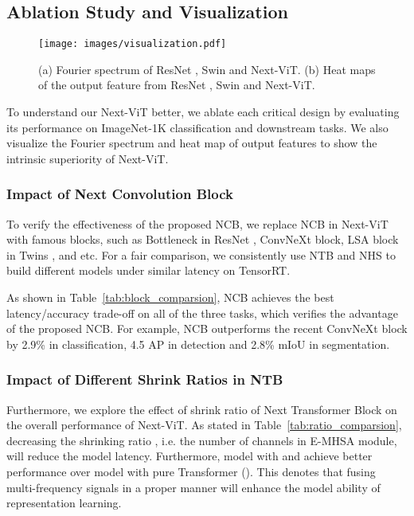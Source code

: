 \documentclass[10pt,twocolumn,letterpaper]{article}
\begin{document}
\subsection{Ablation Study and Visualization}

\begin{figure}[t]
    \centering
    \texttt{[image: images/visualization.pdf]}
    \caption{(a) Fourier spectrum of ResNet \cite{ResNet}, Swin \cite{Swin} and Next-ViT. (b) Heat maps of the output feature from ResNet \cite{ResNet}, Swin \cite{Swin} and Next-ViT.}
    \label{fig:visualization}
\end{figure}

	To understand our Next-ViT better, we ablate each critical design by evaluating its performance on ImageNet-1K classification and downstream tasks. We also visualize the Fourier spectrum and heat map of output features to show the intrinsic superiority of Next-ViT.
	
\subsubsection{Impact of Next Convolution Block}
 To verify the effectiveness of the proposed NCB, we replace NCB in Next-ViT with famous blocks, such as Bottleneck in ResNet \cite{ResNet}, ConvNeXt\cite{ConvNext} block, LSA block in Twins \cite{Twins}, and etc. For a fair comparison, we consistently use NTB and NHS to build different models under similar latency on TensorRT.
 
 As shown in Table~\ref{tab:block_comparsion}, NCB achieves the best latency/accuracy trade-off on all of the three tasks, which verifies the advantage of the proposed NCB. For example, NCB outperforms the recent ConvNeXt block\cite{ResNet} by 2.9\% in classification, 4.5 AP in detection and 2.8\% mIoU in segmentation.

 
\subsubsection{Impact of Different Shrink Ratios in NTB}
Furthermore, we explore the effect of shrink ratio  of Next Transformer Block on the overall performance of Next-ViT.
As stated in Table~\ref{tab:ratio_comparsion}, decreasing the shrinking ratio , i.e. the number of channels in E-MHSA module, will reduce the model latency. Furthermore, model with  and  achieve better performance over model with pure Transformer (). This denotes that fusing multi-frequency signals in a proper manner will enhance the model ability of representation learning.
\end{document}
